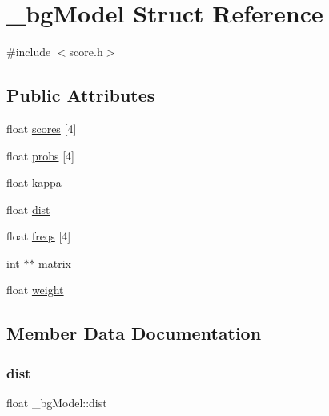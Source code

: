 \hypertarget{struct__bgModel}{}\section{\+\_\+bg\+Model Struct Reference}
\label{struct__bgModel}


{\ttfamily \#include $<$score.\+h$>$}

\subsection*{Public Attributes}
\begin{DoxyCompactItemize}
\item 
float \hyperlink{struct__bgModel_af4fae6328e121d42a0a8fb3dd882c549}{scores} \mbox{[}4\mbox{]}
\item 
float \hyperlink{struct__bgModel_ac106ea61c120d4a60f38c98a97254f49}{probs} \mbox{[}4\mbox{]}
\item 
float \hyperlink{struct__bgModel_a251b8c86d6c01c5f1813c37df31c3096}{kappa}
\item 
float \hyperlink{struct__bgModel_a3757c1ef6b0176dfdeb6046365bf8524}{dist}
\item 
float \hyperlink{struct__bgModel_a906bda936ba864ba209eecff5f1ab721}{freqs} \mbox{[}4\mbox{]}
\item 
int $\ast$$\ast$ \hyperlink{struct__bgModel_a6843a94f9717bd58819c3fbffe9fbe56}{matrix}
\item 
float \hyperlink{struct__bgModel_a00821dd196f2cf6dbccbfa8400a15752}{weight}
\end{DoxyCompactItemize}


\subsection{Member Data Documentation}
\mbox{\label{struct__bgModel_a3757c1ef6b0176dfdeb6046365bf8524}} 
\subsubsection{\texorpdfstring{dist}{dist}}
{\footnotesize\ttfamily float \+\_\+bg\+Model\+::dist}

\mbox{\label{struct__bgModel_a906bda936ba864ba209eecff5f1ab721}} 
